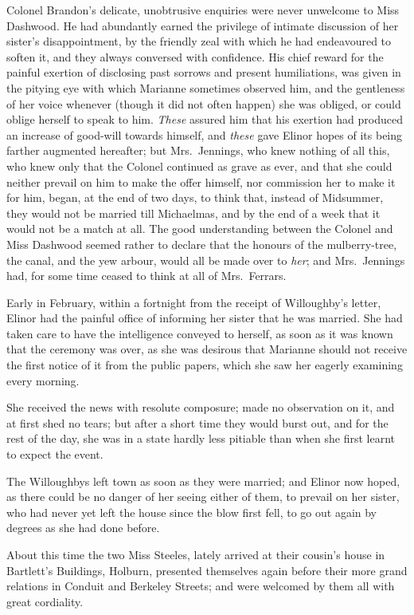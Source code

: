 \documentclass{article}
\begin{document}
Colonel Brandon's delicate, unobtrusive enquiries
were never unwelcome to Miss Dashwood.  He had abundantly
earned the privilege of intimate discussion of her
sister's disappointment, by the friendly zeal with
which he had endeavoured to soften it, and they always
conversed with confidence.  His chief reward for the
painful exertion of disclosing past sorrows and present
humiliations, was given in the pitying eye with which
Marianne sometimes observed him, and the gentleness
of her voice whenever (though it did not often happen)
she was obliged, or could oblige herself to speak to him.
\emph{These} assured him that his exertion had produced an
increase of good-will towards himself, and \emph{these} gave
Elinor hopes of its being farther augmented hereafter;
but Mrs.\ Jennings, who knew nothing of all this, who knew
only that the Colonel continued as grave as ever, and that
she could neither prevail on him to make the offer himself,
nor commission her to make it for him, began, at the
end of two days, to think that, instead of Midsummer,
they would not be married till Michaelmas, and by the
end of a week that it would not be a match at all.
The good understanding between the Colonel and Miss
Dashwood seemed rather to declare that the honours
of the mulberry-tree, the canal, and the yew arbour,
would all be made over to \emph{her}; and Mrs.\ Jennings had,
for some time ceased to think at all of Mrs.\ Ferrars.

Early in February, within a fortnight from the
receipt of Willoughby's letter, Elinor had the painful
office of informing her sister that he was married.
She had taken care to have the intelligence conveyed
to herself, as soon as it was known that the ceremony
was over, as she was desirous that Marianne should not
receive the first notice of it from the public papers,
which she saw her eagerly examining every morning.

She received the news with resolute composure;
made no observation on it, and at first shed no tears;
but after a short time they would burst out, and for the
rest of the day, she was in a state hardly less pitiable
than when she first learnt to expect the event.

The Willoughbys left town as soon as they were married;
and Elinor now hoped, as there could be no danger
of her seeing either of them, to prevail on her sister,
who had never yet left the house since the blow first fell,
to go out again by degrees as she had done before.

About this time the two Miss Steeles, lately arrived
at their cousin's house in Bartlett's Buildings,
Holburn, presented themselves again before their more
grand relations in Conduit and Berkeley Streets;
and were welcomed by them all with great cordiality.
\end{document}

